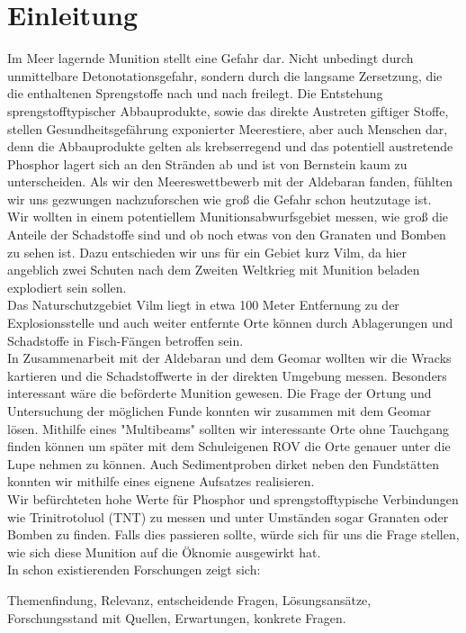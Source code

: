  

\chapter[Einleitung]{Einleitung}

Im Meer lagernde Munition stellt eine Gefahr dar. Nicht unbedingt durch unmittelbare Detonotationsgefahr, 
sondern durch die langsame Zersetzung, die die enthaltenen Sprengstoffe nach und nach 
freilegt\cite{zeitbomben}. Die Entstehung sprengstofftypischer Abbauprodukte, sowie das direkte Austreten 
giftiger Stoffe, stellen Gesundheitsgefährung exponierter Meerestiere, aber auch Menschen dar, denn die
Abbauprodukte gelten als krebserregend und das potentiell austretende Phosphor lagert sich an den Stränden 
ab und ist von Bernstein kaum zu unterscheiden. Als wir den Meereswettbewerb mit der Aldebaran fanden, 
fühlten wir uns gezwungen nachzuforschen wie groß die Gefahr schon heutzutage ist.\\

Wir wollten in einem potentiellem Munitionsabwurfsgebiet messen, wie groß die Anteile der Schadstoffe sind und 
ob noch etwas von den Granaten und Bomben zu sehen ist. Dazu entschieden wir uns für ein Gebiet kurz Vilm,
da hier angeblich zwei Schuten nach dem Zweiten Weltkrieg mit Munition beladen explodiert sein sollen.\\

Das Naturschutzgebiet Vilm liegt in etwa 100 Meter Entfernung zu der Explosionsstelle und auch weiter 
entfernte Orte können durch Ablagerungen und Schadstoffe in Fisch-Fängen betroffen sein.\\

In Zusammenarbeit mit der Aldebaran und dem Geomar wollten wir die Wracks kartieren und die Schadstoffwerte in
der direkten Umgebung messen. Besonders interessant wäre die beförderte Munition gewesen. Die Frage der
Ortung und Untersuchung der möglichen Funde konnten wir zusammen mit dem Geomar lösen. Mithilfe eines 
"Multibeams" sollten wir interessante Orte ohne Tauchgang finden können um später mit dem Schuleigenen 
ROV die Orte genauer unter die Lupe nehmen zu können. Auch Sedimentproben dirket neben den Fundstätten 
konnten wir mithilfe eines eignene Aufsatzes realisieren.\\

Wir befürchteten hohe Werte für Phosphor und sprengstofftypische Verbindungen wie Trinitrotoluol (TNT) 
zu messen und unter Umständen sogar Granaten oder Bomben zu finden. Falls dies passieren sollte, würde 
sich für uns die Frage stellen, wie sich diese Munition auf die Öknomie ausgewirkt hat. \\

In schon existierenden Forschungen zeigt sich:

Themenfindung, Relevanz, entscheidende Fragen, Lösungsansätze, Forschungsstand mit Quellen, Erwartungen, konkrete Fragen.
